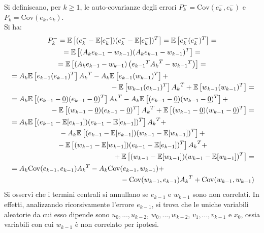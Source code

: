 \documentclass[12pt,a4paper,openright,twoside]{book}
\begin{document}
Si definiscano, per $k\geq 1$, le auto-covarianze degli errori $P_k^-=\mathrm{Cov}(e_k^-,e_k^-)$ e $P_k=\mathrm{Cov}(e_k,e_k)$. \\
Si ha:
\begin{gather*}
P_k^-=\mathbb{E}\left[(e_k^--\mathbb{E}[e_k^-])(e_k^--\mathbb{E}[e_k^-])^T\right]=\mathbb{E}\left[e_k^-(e_k^-)^T\right]= \\
=\mathbb{E}\left[(A_ke_{k-1}-w_{k-1})(A_ke_{k-1}-w_{k-1})^T\right]= \\
=\mathbb{E}\left[(A_ke_{k-1}-w_{k-1})\left({e_{k-1}}^T{A_k}^T-{w_{k-1}}^T\right)\right]= \\
\begin{multlined}[\textwidth]
=A_k\mathbb{E}\left[e_{k-1}(e_{k-1})^T\right]{A_k}^T-A_k\mathbb{E}\left[e_{k-1}(w_{k-1})^T\right]+ \\
-\mathbb{E}\left[w_{k-1}(e_{k-1})^T\right]{A_k}^T+\mathbb{E}\left[w_{k-1}(w_{k-1})^T\right]=
\end{multlined} \\
\begin{multlined}[\textwidth]
=A_k\mathbb{E}\left[(e_{k-1}-\underline{0})(e_{k-1}-\underline{0})^T\right]{A_k}^T-A_k\mathbb{E}\left[(e_{k-1}-\underline{0})(w_{k-1}-\underline{0})^T\right]+ \\
-\mathbb{E}\left[(w_{k-1}-\underline{0})(e_{k-1}-\underline{0})^T\right]{A_k}^T+\mathbb{E}\left[(w_{k-1}-\underline{0})(w_{k-1}-\underline{0})^T\right]=
\end{multlined} \\
\begin{multlined}[\textwidth]
=A_k\mathbb{E}\left[(e_{k-1}-\mathbb{E}[e_{k-1}])(e_{k-1}-\mathbb{E}[e_{k-1}])^T\right]{A_k}^T+ \\
-A_k\mathbb{E}\left[(e_{k-1}-\mathbb{E}[e_{k-1}])(w_{k-1}-\mathbb{E}[w_{k-1}])^T\right]+ \\
-\mathbb{E}\left[(w_{k-1}-\mathbb{E}[w_{k-1}])(e_{k-1}-\mathbb{E}[e_{k-1}])^T\right]{A_k}^T+ \\
+\mathbb{E}\left[(w_{k-1}-\mathbb{E}[w_{k-1}])(w_{k-1}-\mathbb{E}[w_{k-1}])^T\right]=
\end{multlined} \\
\begin{multlined}[\textwidth]
=A_k\mathrm{Cov}(e_{k-1},e_{k-1}){A_k}^T-A_k\mathrm{Cov}(e_{k-1},w_{k-1})+ \\
-\mathrm{Cov}(w_{k-1},e_{k-1}){A_k}^T+\mathrm{Cov}(w_{k-1},w_{k-1})
\end{multlined}
\end{gather*}
Si osservi che i termini centrali si annullano se $e_{k-1}$ e $w_{k-1}$ sono non correlati. In effetti, analizzando ricorsivamente l'errore $e_{k-1}$, si trova che le uniche variabili aleatorie da cui esso dipende sono $u_0,...,u_{k-2}$, $w_0,...,w_{k-2}$, $v_1,...,v_{k-1}$ e $x_0$, ossia variabili con cui $w_{k-1}$ è non correlato per ipotesi. \\
\end{document}
